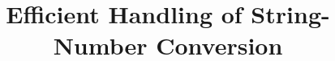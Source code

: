\documentclass[sigplan,review,anonymous]{acmart}\settopmatter{printfolios=true,printccs=false,printacmref=false}
\title{Efficient Handling of String-Number Conversion}
\author{}
\begin{document}
\newcommand{\hide}[1]{}
\newcommand{\tool}{{\textsf{Z3-PFA}}}
\newcommand{\dr}{\mathcal{R}}
\newcommand{\nat}{\mathbb{N}}
\newcommand{\integers}{\mathbb{Z}}
\newcommand{\todo}[1]{{\color{blue}TODO: #1}}
\newcommand{\lh}[1]{{\color{orange}Lukas: #1}}
\newcommand{\changed}[1]{{\color{orange}#1}}
\newcommand{\yfc}[1]{{\color{blue}YFC: #1}}
\newcommand{\petr}[1]{{\color{pink}Petr: #1}}
\newcommand{\chatAt}[2]{\mbox{\textsf{charAt}($#1$, $#2$)}}
\newcommand{\ite}[3]{\mbox{\textsf{ite}($#1$, $#2$, $#3$)}}
\newcommand{\sti}[1]{\mbox{\textsf{toNum}($#1$)}}
\newcommand{\its}[1]{\mbox{\textsf{toStr}($#1$)}}
\newcommand{\varn}{\mbox{$\mathbb{V}_{\mathbb{Z}}$}}
\newcommand{\vars}{\mbox{$\mathbb{V}_{\Sigma^*}$}}
\newcommand{\cvars}{\mbox{$\mathbb{V}_{\Sigma_\epsilon}$}}
\newcommand{\pvars}{\mbox{$\mathbb{V}_{\sharp}$}}
\newcommand{\cvarone}{V}
\newcommand{\cvartwo}{V'}
\newcommand{\cvar}{V}
\newcommand{\modelsof}[1]{[\![#1]\!]}
\newcommand{\true}{\mbox{$\mathsf{true}$}}
\newcommand{\false}{\mbox{$\mathsf{false}$}}
\newcommand{\enc}[1]{[\![#1]\!]}
\newcommand{\parikhof}[1]{\mathbb{P}{(#1)}}
\newcommand{\parikhwof}[2]{|#1|_{#2}}
\newcommand{\semof}[1]{\modelsof{#1}}
\newcommand{\decode}[1]{\mathit{decode_{#1}}}
\newcommand{\parikhfof}[1]{\Phi_{\mathbb{P}}(#1)} %
\newcommand{\pim}{I_{\#}}
\newcommand{\syncop}{\times}
\newcommand{\syncof}[2]{#1 \syncop #2}
\newcommand{\syncfof}[2]{\Psi_{\syncof {#1} {#2}}}
\newcommand{\syncT}{T_\syncop}
\newcommand{\pvarsof}[1]{\#{#1}}
\newcommand{\pvar}{\pvarsof V}
\newcommand{\pvarone}{\pvarsof V}
\newcommand{\pvartwo}{\pvarsof {V'}}
\newcommand{\defeq}{::=}
\newcommand{\encode}[1]{\mathit{encode}_{#1}}
\newcommand{\eqwrt}[1]{=_{#1}}
\newcommand{\iequiv}{\equiv}
\newcommand{\restrict}[2]{#1_{#2}}
\newcommand{\underf}[2]{\mathit{under}_#1(#2)}
\newcommand{\paf}{\psi}

\newcommand\pa{P}
\newcommand{\leftA}{\pa^{\mathit{left}}}
\newcommand{\rightA}{\pa^{\mathit{right}}}
\newcommand{\leftV}{V^{\mathit{left}}}
\newcommand{\rightV}{V^{\mathit{right}}}
\newcommand\renvars{V_\dr^\mathsf{ver}}
\end{document}
